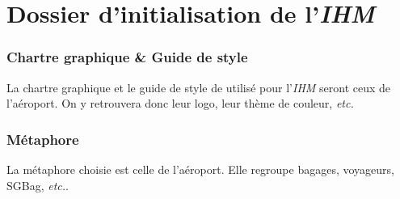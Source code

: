 \newpage
\part{Dossier d'initialisation de l'\textsl{IHM}}
\section{Chartre graphique \& Guide de style}
La chartre graphique et le guide de style de utilisé pour l'\textsl{IHM} seront ceux de l'aéroport. On y retrouvera donc leur logo, leur thème de couleur, \textsl{etc.}

\section{Métaphore}
La métaphore choisie est celle de \og l'aéroport\fg. Elle regroupe \og bagages, voyageurs, SGBag, \textsl{etc.}\fg.
